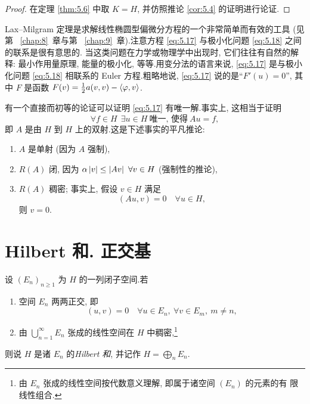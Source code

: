 \begin{proof}
在定理  \ref{thm:5.6} 中取 $K=H$, 并仿照推论  \ref{cor:5.4} 的证明进行论证.
\end{proof}

\begin{remark}
\label{rem:5.7}
Lax--Milgram 定理是求解线性椭圆型偏微分方程的一个非常简单而有效的工具 (见
第~
\ref{chap:8}~章与第~
\ref{chap:9}~章).注意方程 \eqref{eq:5.17} 与极小化问题 \eqref{eq:5.18} 之间的联系是很有意思的.
当这类问题在力学或物理学中出现时, 它们往往有自然的解释: 最小作用量原理, 能量的极小化, 等等.用变分法的语言来说, \eqref{eq:5.17} 是与极小化问题 \eqref{eq:5.18} 相联系的
Euler 方程.粗略地说, \eqref{eq:5.17} 说的是``$F'(u)=0$'', 其中 $F$ 是函数
$F(v)=\frac12a(v,v)-\left\langle \varphi,v\right\rangle$.
\end{remark}

\begin{remark}
\label{rem:5.8}
有一个直接而初等的论证可以证明 \eqref{eq:5.17} 有唯一解.事实上, 这相当于证明
\begin{equation*}
\forall f\in H\ \ \exists u\in H\ \text{唯一, 使得}\ Au=f,
\end{equation*}
即 $A$ 是由 $H$ 到 $H$ 上的双射.这是下述事实的平凡推论:
\begin{enumerate}[label=(\alph*), leftmargin=2.2em, itemsep=0.2em]
	\item $A$ 是单射 (因为 $A$ 强制),
	\item $R(A)$ 闭, 因为 $\alpha\left|v\right|\le\left|Av\right|\ \forall v\in H$
	      (强制性的推论),
	\item $R(A)$ 稠密; 事实上, 假设 $v\in H$ 满足
	      \begin{equation*}
	      (Au,v)=0\quad\forall u\in H,
	      \end{equation*}
	      则 $v=0$.
\end{enumerate}
\end{remark}

\section{Hilbert 和. 正交基}
\label{sec:5.4}

\begin{definition}
设 $(E_n)_{n\ge1}$ 为 $H$ 的一列闭子空间.若
\begin{enumerate}[label=(\alph*), leftmargin=2.2em, itemsep=0.25em]
	\item 空间 $E_n$ 两两正交, 即
	      \begin{equation*}
	      (u,v)=0\quad\forall u\in E_n,\ \forall v\in E_m,\ m\ne n,
	      \end{equation*}
	\item 由 $\bigcup_{n=1}^\infty E_n$ 张成的线性空间在 $H$ 中稠密,\footnote{由
	      $E_n$ 张成的线性空间按代数意义理解, 即属于诸空间 $(E_n)$ 的元素的有
	      限线性组合.}
\end{enumerate}
则说 $H$ 是诸 $E_n$ 的\emph{Hilbert 和}, 并记作 $H=\bigoplus_nE_n$.
\end{definition}


